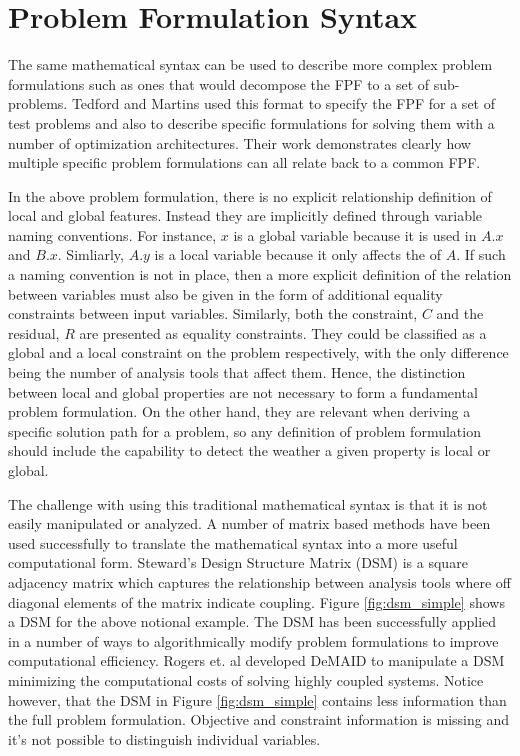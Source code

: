     \section{Problem Formulation Syntax}

    The same mathematical syntax can be used to describe more complex problem formulations
    such as ones that would decompose the FPF to a set of sub-problems. Tedford and Martins used this format to specify the 
    FPF for a set of test problems and also to describe specific formulations for solving them with a 
    number of optimization architectures\cite{Tedford2009}. Their work demonstrates clearly how multiple specific 
    problem formulations can all relate back to a common FPF. 

    In the above problem formulation, there is no explicit relationship definition of local and global features. Instead they are 
    implicitly defined through variable naming conventions. For instance, $x$ is a global variable because it is used in $A.x$ and $B.x$. 
    Simliarly, $A.y$ is a local variable because it only affects the of $A$. If such a naming convention is not in place, 
    then a more explicit definition of the relation between variables must also be given in the form of additional equality constraints between 
    input variables. Similarly, both the constraint, $C$ and the residual, $R$ are presented as equality constraints. They could be classified as 
    a global and a local constraint on the problem respectively, with the only difference being the number of analysis tools that affect them.  
    Hence, the distinction between local and global properties are not necessary to form a fundamental 
    problem formulation. On the other hand, they are relevant when deriving a specific solution path for a problem, so any definition of problem 
    formulation should include the capability to detect the weather a given property is local or global. 

    The challenge with using this traditional mathematical syntax is that it is not easily manipulated or analyzed. 
    A number of matrix based methods have been used successfully to translate the mathematical syntax into a more useful computational form. 
    Steward's Design Structure Matrix (DSM) is a square adjacency matrix which captures the relationship between analysis tools where off 
    diagonal elements of the matrix indicate coupling\cite{Steward1981}. Figure \ref{fig:dsm_simple} shows a DSM for the above notional example. 
    The DSM has been successfully applied in a number of ways to algorithmically modify problem formulations to 
    improve computational efficiency. Rogers et. al developed DeMAID to manipulate a
    DSM  minimizing the computational costs of solving highly coupled systems\cite{Rogers1996}. Notice however, that the DSM in 
    Figure \ref{fig:dsm_simple} contains less information than the full problem formulation. Objective and constraint information 
    is missing and it's not possible to distinguish individual variables.

